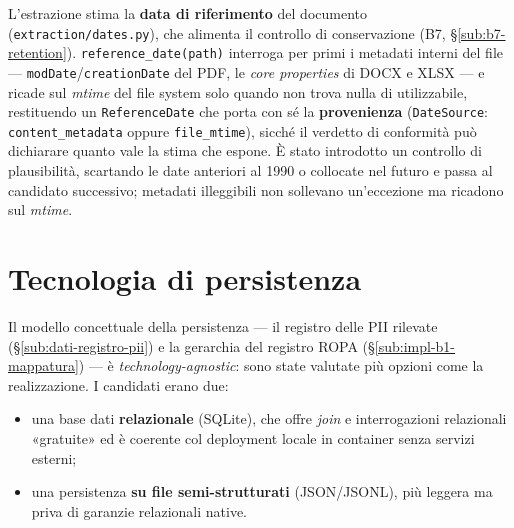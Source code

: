 L'estrazione stima la \textbf{data di riferimento} del documento (\texttt{extraction/dates.py}), che alimenta il controllo di conservazione (B7, §\ref{sub:b7-retention}). \texttt{reference\_date(path)} interroga per primi i metadati interni del file --- \texttt{modDate}/\texttt{creationDate} del PDF, le \emph{core properties} di DOCX e XLSX --- e ricade sul \emph{mtime} del file system solo quando non trova nulla di utilizzabile, restituendo un \texttt{ReferenceDate} che porta con sé la \textbf{provenienza} (\texttt{DateSource}: \texttt{content\_metadata} oppure \texttt{file\_mtime}), sicché il verdetto di conformità può dichiarare quanto vale la stima che espone. È stato introdotto un controllo di plausibilità, scartando le date anteriori al 1990 o collocate nel futuro e passa al candidato successivo; metadati illeggibili non sollevano un'eccezione ma ricadono sul \emph{mtime}.

\section{Tecnologia di persistenza}
\label{sec:implementazione-persistenza-tecnologia}

Il modello concettuale della persistenza --- il registro delle PII rilevate (§\ref{sub:dati-registro-pii}) e la gerarchia del registro ROPA (§\ref{sub:impl-b1-mappatura}) --- è \textit{technology-agnostic}: sono state valutate più opzioni come la realizzazione. I candidati erano due:
\begin{itemize}
	\item una base dati \textbf{relazionale} (SQLite), che offre \textit{join} e interrogazioni relazionali «gratuite» ed è coerente col deployment locale in container senza servizi esterni;
	\item una persistenza \textbf{su file semi-strutturati} (JSON/JSONL), più leggera ma priva di garanzie relazionali native.
\end{itemize}

